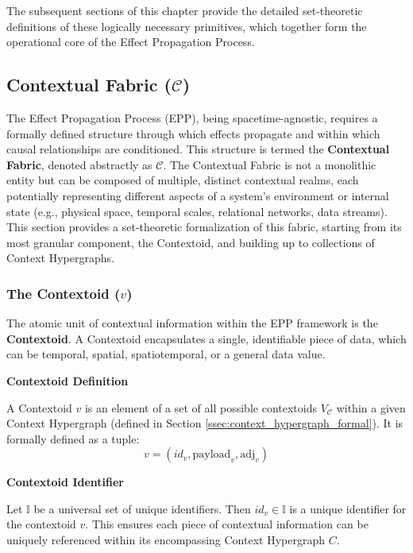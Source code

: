 The subsequent sections of this chapter provide the detailed set-theoretic definitions of these logically necessary primitives, which together form the operational core of the Effect Propagation Process.

\subsection[Contextual Fabric (C)]{Contextual Fabric (\(\mathcal{C}\))}
\label{sec:formalization_context}

The Effect Propagation Process (EPP), being spacetime-agnostic, requires a formally defined structure through which effects propagate and within which causal relationships are conditioned. This structure is termed the \textbf{Contextual Fabric}, denoted abstractly as \(\mathcal{C}\). The Contextual Fabric is not a monolithic entity but can be composed of multiple, distinct contextual realms, each potentially representing different aspects of a system's environment or internal state (e.g., physical space, temporal scales, relational networks, data streams). This section provides a set-theoretic formalization of this fabric, starting from its most granular component, the Contextoid, and building up to collections of Context Hypergraphs.

\newpage

\subsubsection[The Contextoid (v)]{The Contextoid (\(v\))}
\label{ssec:contextoid_formal}

The atomic unit of contextual information within the EPP framework is the \textbf{Contextoid}. A Contextoid encapsulates a single, identifiable piece of data, which can be temporal, spatial, spatiotemporal, or a general data value.

\textbf{Contextoid Definition}

A Contextoid \( v \) is an element of a set of all possible contextoids \( V_{\mathcal{C}} \) within a given Context Hypergraph (defined in Section \ref{ssec:context_hypergraph_formal}). It is formally defined as a tuple:
\[ v = (id_v, \text{payload}_v, \text{adj}_v) \]


\textbf{Contextoid Identifier}

Let \(\mathbb{I}\) be a universal set of unique identifiers.
Then \( id_v \in \mathbb{I} \) is a unique identifier for the contextoid \(v\). This ensures each piece of contextual information can be uniquely referenced within its encompassing Context Hypergraph \(C\).


